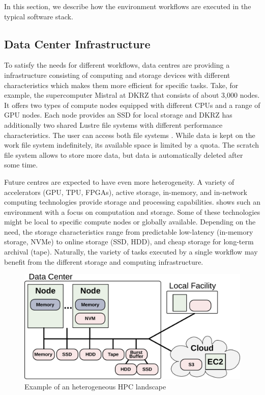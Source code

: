 \documentclass[a4paper]{article}
\newcommand{\jk}[1]{\todo[inline]{JK: #1}}
\begin{document}
In this section, we describe how the environment workflows are executed in the typical software stack.

\subsection{Data Center Infrastructure}

To satisfy the needs for different workflows, data centres are providing a infrastructure consisting of computing and storage devices with different characteristics which makes them more efficient for specific tasks.
Take, for example, the supercomputer Mistral at DKRZ that consists of about {\color{cyan}{about?}} 3,000 nodes.
It offers two types of compute nodes equipped with different CPUs and a range of GPU nodes.
Each node provides an SSD for local storage and DKRZ has additionally two shared Lustre file systems with different performance characteristics.
The user can access both file systems \sout{{\color{blue}{as a work and scratch file system}}}. {\color{cyan}{as work and scratch file systems.}}
While data is kept on the work file system indefinitely, its available space is limited by a quota.
The scratch file system allows to store more data, but data is automatically deleted after some time.

Future centres are expected to have even more heterogeneity. A variety of accelerators (GPU, TPU, FPGAs), active storage, in-memory, and in-network computing technologies provide storage and processing capabilities.
 shows such an environment with a focus on computation and storage.
Some of these technologies might be local to specific compute nodes or globally available.
Depending on the need, the storage characteristics range from predictable low-latency (in-memory storage, NVMe) to online storage (SSD, HDD), and cheap storage for long-term archival (tape).
\jk{Mention BBs, e.g., DDN IME}
Naturally, the variety of tasks executed by a single workflow may benefit from the different storage and computing infrastructure.

\begin{figure}[H]
  \centering
  \includegraphics[width=0.6\columnwidth]{system}
  \caption{Example of an heterogeneous HPC landscape}
  \label{fig:heterogeneous}
\end{figure}
\end{document}
